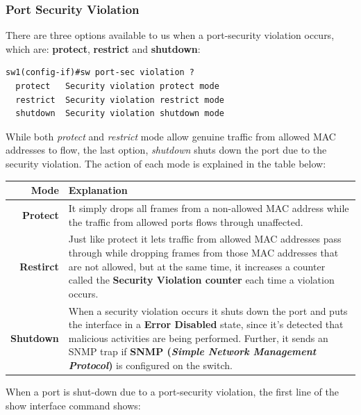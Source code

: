 \subsubsection{Port Security Violation}
\vspace{-10pt}
There are three options available to us when a port-security violation occurs, which are: \textbf{protect}, \textbf{restrict} and \textbf{shutdown}:

\vspace{-15pt}
\begin{verbatim}
sw1(config-if)#sw port-sec violation ?
  protect   Security violation protect mode
  restrict  Security violation restrict mode
  shutdown  Security violation shutdown mode
\end{verbatim}
\vspace{-10pt}

\noindent
While both \textit{protect} and \textit{restrict} mode allow genuine traffic from allowed MAC addresses to flow, the last option, \textit{shutdown} shuts down the port due to the security violation. The action of each mode is explained in the table below:

\vspace{-10pt}
\begin{center}
	\begin{tabular}{rm{}}
	\toprule
	\textbf{Mode} &\textbf{Explanation}\\
	\midrule
	\textbf{Protect}	&It simply drops all frames from a non-allowed MAC address while the traffic from allowed ports flows through unaffected.\\
	\textbf{Restirct}	&Just like protect it lets traffic from allowed MAC addresses pass through while dropping frames from those MAC addresses that are not allowed, but at the same time, it increases a counter called the \textbf{Security Violation counter} each time a violation occurs.\\
	\textbf{Shutdown}	&When a security violation occurs it shuts down the port and puts the interface in a \textbf{Error Disabled} state, since it's detected that malicious activities are being performed. Further, it sends an SNMP trap if \textbf{SNMP (\textit{Simple Network Management Protocol})} is configured on the switch.\\
	\bottomrule
	\end{tabular}
\end{center}
\vspace{-10pt}
\noindent
When a port is shut-down due to a port-security violation, the first line of the show interface command shows:

